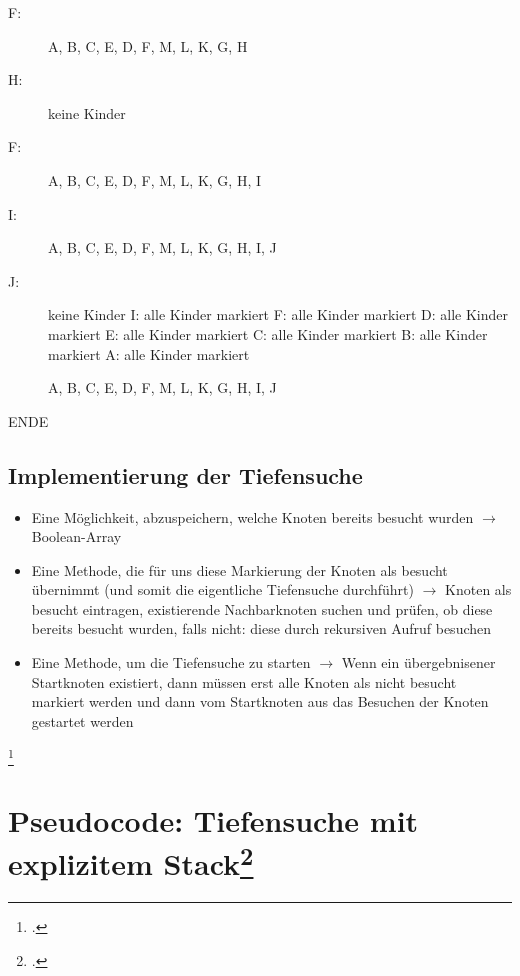\documentclass{lehramt-informatik-haupt}
\begin{document}
\begin{description}
\item[F:]
A, B, C, E, D, F, M, L, K, G, H

\item[H:] keine Kinder

\item[F:]
A, B, C, E, D, F, M, L, K, G, H, I

\item[I:]
A, B, C, E, D, F, M, L, K, G, H, I, J

\item[J:] keine Kinder
I: alle Kinder markiert
F: alle Kinder markiert
D: alle Kinder markiert
E: alle Kinder markiert
C: alle Kinder markiert
B: alle Kinder markiert
A: alle Kinder markiert

A, B, C, E, D, F, M, L, K, G, H, I, J

\end{description}

ENDE

\subsection{Implementierung der Tiefensuche}

\begin{itemize}
\item Eine Möglichkeit, abzuspeichern, welche Knoten bereits besucht
wurden $\rightarrow$ Boolean-Array

\item Eine Methode, die für uns diese Markierung der Knoten als besucht
übernimmt (und somit die eigentliche Tiefensuche durchführt)
$\rightarrow$  Knoten als besucht eintragen, existierende Nachbarknoten
suchen und prüfen, ob diese bereits besucht wurden, falls nicht: diese
durch rekursiven Aufruf besuchen

\item Eine Methode, um die Tiefensuche zu starten $\rightarrow$  Wenn
ein übergebnisener Startknoten existiert, dann müssen erst alle Knoten
als nicht besucht markiert werden und dann vom Startknoten aus das
Besuchen der Knoten gestartet werden
\end{itemize}
\footcite[Seite 45]{aud:fs:6}

\section{Pseudocode: Tiefensuche mit explizitem Stack\footcite[Seite 51 (PDF 45)]{aud:fs:6}}
\end{document}

